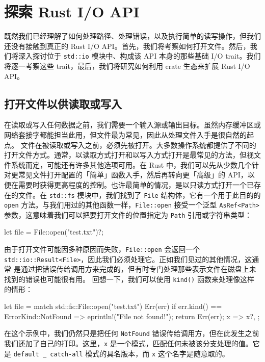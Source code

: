 \section{探索 Rust I/\allowbreak{}O API}
\label{idx:idx_93200f4a}
既然我们已经理解了如何处理路径、处理错误，以及执行简单的读写操作，但我们还没有接触到真正的 Rust I/\allowbreak{}O API。首先，我们将考察如何打开文件。然后，我们将深入探讨位于 \texttt{std::io} 模块中、构成该 API 本身的那些基础 I/\allowbreak{}O trait。我们将逐一考察这些 trait，最后，我们将研究如何利用 crate 生态来扩展 Rust I/\allowbreak{}O API。
\subsection{打开文件以供读取或写入}
\label{idx:idx_743b735a}
在读取或写入任何数据之前，我们需要一个输入源或输出目标。虽然内存缓冲区或网络套接字都能担当此用，但文件最为常见，因此从处理文件入手是很自然的起点。
文件在被读取或写入之前，必须先被打开。大多数操作系统都提供了不同的打开文件方式。通常，以读取方式打开和以写入方式打开是最常见的方法，但视文件系统而定，可能还有许多其他选项可用。在 Rust 中，我们可以先从少数几个针对更常见文件打开配置的「简单」函数入手，然后再转向更「高级」的 API，以便在需要时获得更高程度的控制。也许最简单的情况，是以只读方式打开一个已存在的文件。在 \texttt{std::fs} 模块中，我们找到了 \texttt{File} 结构体，它有一个用于此目的的 \texttt{open} 方法。与我们用过的其他函数一样，\texttt{File::open} 接受一个泛型 \texttt{AsRef<Path>} 参数，这意味着我们可以把要打开文件的位置指定为 \texttt{Path} 引用或字符串类型：
\begin{codebox}[rust]
let file = File::open("test.txt")?;
\end{codebox}
由于打开文件可能因多种原因而失败，\texttt{File::open} 会返回一个
\texttt{std::\allowbreak{}io::\allowbreak{}Result<\allowbreak{}File>\allowbreak{}}，因此我们必须处理它。正如我们见过的其他情况，这通常
\label{idx:idx_82c3a411}
是通过把错误传给调用方来完成的，但有时专门处理那些表示文件在磁盘上未找到的错误也可能很有用。
回想一下，我们可以使用 \texttt{kind()} 函数来处理像这样的情形：
\begin{codebox}[rust]
let file = match std::fs::File::open("test.txt") {
    Err(err) if err.kind() == ErrorKind::NotFound => {
        eprintln!("File not found!");
        return Err(err);
    }
    x => x?,
};
\end{codebox}
在这个示例中，我们仍然只是把任何 \texttt{NotFound} 错误传给调用方，但在此发生之前我们还加了自己的打印。这里，\texttt{x} 是一个模式，匹配任何未被该分支处理的值。它是 \texttt{default \_\allowbreak{} catch-\allowbreak{}all} 模式的具名版本，而 \texttt{x} 这个名字是随意取的。
